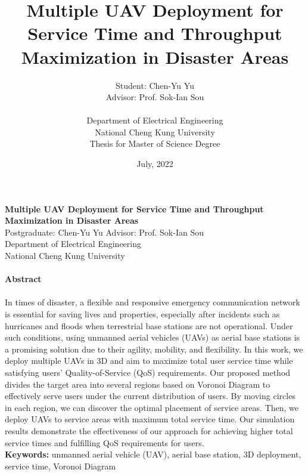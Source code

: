 \documentclass[a4paper,12pt]{report}
\title{Multiple UAV Deployment for Service Time and Throughput Maximization in Disaster Areas\\}
\author{Student: Chen-Yu Yu \\
Advisor: Prof. Sok-Ian Sou\\
\\
Department of Electrical Engineering  \\
National Cheng Kung University \\
Thesis for Master of Science Degree \\
}
\date{July, 2022}
\begin{document}

\maketitle

    \begin{center}
        {\bf\large Multiple UAV Deployment for Service Time and Throughput Maximization in Disaster Areas}\\
        {Postgraduate: Chen-Yu Yu \hspace{8mm} Advisor: Prof. Sok-Ian Sou}\\
        {Department of Electrical Engineering}\\
        {National Cheng Kung University}\\
    \end{center}

    \paragraph{}
    \begin{center}
        {\bf Abstract}\\
    \end{center}
    \paragraph{}
    In times of disaster, a flexible and responsive emergency communication network is essential for saving lives and properties, especially after incidents such as hurricanes and floods when terrestrial base stations are not operational. Under such conditions, using unmanned aerial vehicles (UAVs) as aerial base stations is a promising solution due to their agility, mobility, and flexibility. In this work, we deploy multiple UAVs in 3D and aim to maximize total user service time while satisfying users' Quality-of-Service (QoS) requirements. Our proposed method divides the target area into several regions based on Voronoi Diagram to effectively serve users under the current distribution of users. By moving circles in each region, we can discover the optimal placement of service areas. Then, we deploy UAVs to service areas with maximum total service time. Our simulation results demonstrate the effectiveness of our approach for achieving higher total service times and fulfilling QoS requirements for users.\\
    
    \textbf{Keywords:} {unmanned aerial vehicle (UAV), aerial base station, 3D deployment, service time, Voronoi Diagram}
\setcounter{page}{2}
\end{document}
